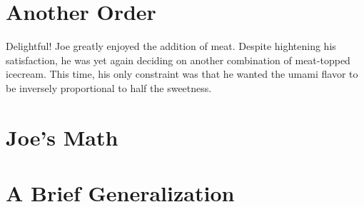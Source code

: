 
\setcounter{chapter}{4}
\chapter{Another Order}
Delightful! Joe greatly enjoyed the addition of meat.
Despite hightening his satisfaction, he was yet again deciding on another combination of meat-topped icecream.
This time, his only constraint was that he wanted the umami flavor to be inversely proportional to half the sweetness.


\setcounter{chapter}{5}
\chapter{Joe's Math}

\setcounter{chapter}{6}
\chapter{A Brief Generalization} %